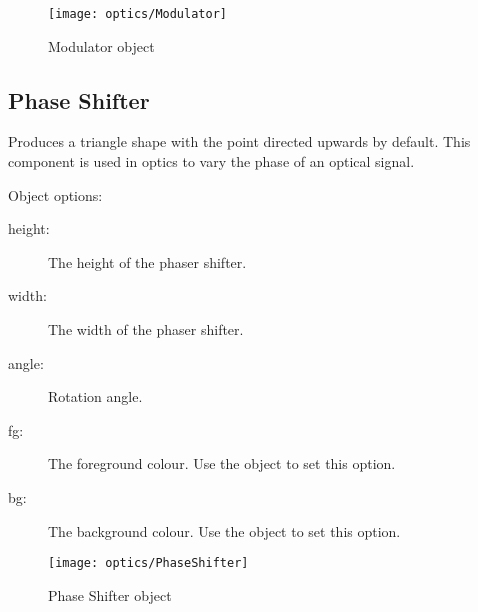 \begin{figure}[!ht]
\centerline{\texttt{[image: optics/Modulator]}}
\caption{Modulator object}
\label{fig:modulator}
\end{figure}

\subsection{Phase Shifter}

Produces a triangle shape with the point directed upwards by default.  This
component is used in optics to vary the phase of an optical signal.

Object options:
\begin{description}
\item[height:] The height of the phaser shifter.
\item[width:] The width of the phaser shifter.
\item[angle:] Rotation angle.
\item[fg:] The foreground colour.  Use the  object to set this
option.
\item[bg:] The background colour.  Use the  object to set this
option.
\end{description}

\begin{figure}[!ht]
\centerline{\texttt{[image: optics/PhaseShifter]}}
\caption{Phase Shifter object}
\label{fig:phase_shifter}
\end{figure}

